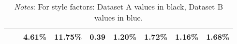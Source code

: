 \documentclass[12pt]{article}
\begin{document}
\begin{table}[H]
{\begin{tabular}{@{}llccccccc@{}}
                              &                                                        & {\color[HTML]{303498} 4.61\%}                               & {\color[HTML]{303498} 11.75\%}                                  & {\color[HTML]{303498} 0.39}                            & {\color[HTML]{303498} 1.20\%}                                 & {\color[HTML]{303498} 1.72\%}                                & {\color[HTML]{303498} 1.16\%}                                 & {\color[HTML]{303498} 1.68\%}                               \\ \bottomrule
\end{tabular}}
\medskip
\caption*{\textit{Notes}: For style factors: Dataset A values in black, Dataset B values in blue.}
\end{table}

\end{document}

